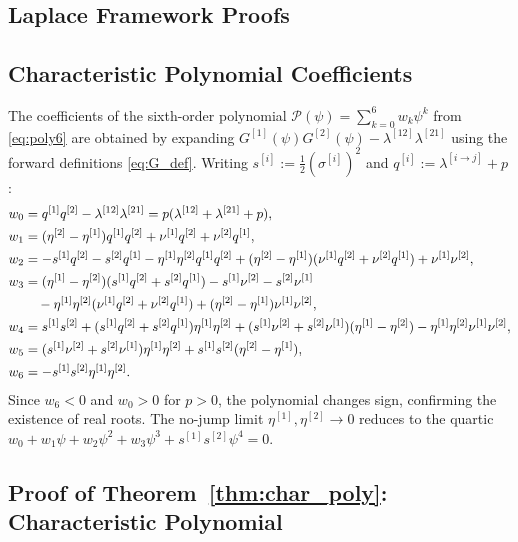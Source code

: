 \documentclass[11pt,a4paper]{article}
\numberwithin{equation}{section}
\begin{document}
\begin{appendices}
\section{Laplace Framework Proofs}\label{app:laplace_proofs}

\subsection{Characteristic Polynomial Coefficients}\label{app:poly_coeffs}

The coefficients of the sixth-order polynomial $\mathcal{P}(\psi) = \sum_{k=0}^6 w_k \psi^k$ from \eqref{eq:poly6} are obtained by expanding $G^{[1]}(\psi)G^{[2]}(\psi) - \lambda^{[12]}\lambda^{[21]}$ using the forward definitions \eqref{eq:G_def}. Writing $s^{[i]} := \tfrac{1}{2}(\sigma^{[i]})^2$ and $q^{[i]} := \lambda^{[i\to j]} + p$:
\begin{align}
w_0 &= q^{[1]}q^{[2]} - \lambda^{[12]}\lambda^{[21]} = p(\lambda^{[12]}+\lambda^{[21]}+p), \notag \\
w_1 &= (\eta^{[2]}-\eta^{[1]})q^{[1]}q^{[2]} + \nu^{[1]}q^{[2]} + \nu^{[2]}q^{[1]}, \notag \\
w_2 &= -s^{[1]}q^{[2]} - s^{[2]}q^{[1]} - \eta^{[1]}\eta^{[2]}q^{[1]}q^{[2]} + (\eta^{[2]}-\eta^{[1]})(\nu^{[1]}q^{[2]}+\nu^{[2]}q^{[1]}) + \nu^{[1]}\nu^{[2]}, \notag \\
w_3 &= (\eta^{[1]}-\eta^{[2]})(s^{[1]}q^{[2]}+s^{[2]}q^{[1]}) - s^{[1]}\nu^{[2]} - s^{[2]}\nu^{[1]} \notag \\
&\quad - \eta^{[1]}\eta^{[2]}(\nu^{[1]}q^{[2]}+\nu^{[2]}q^{[1]}) + (\eta^{[2]}-\eta^{[1]})\nu^{[1]}\nu^{[2]}, \notag \\
w_4 &= s^{[1]}s^{[2]} + (s^{[1]}q^{[2]}+s^{[2]}q^{[1]})\eta^{[1]}\eta^{[2]} + (s^{[1]}\nu^{[2]}+s^{[2]}\nu^{[1]})(\eta^{[1]}-\eta^{[2]}) - \eta^{[1]}\eta^{[2]}\nu^{[1]}\nu^{[2]}, \notag \\
w_5 &= (s^{[1]}\nu^{[2]}+s^{[2]}\nu^{[1]})\eta^{[1]}\eta^{[2]} + s^{[1]}s^{[2]}(\eta^{[2]}-\eta^{[1]}), \notag \\
w_6 &= -s^{[1]}s^{[2]}\eta^{[1]}\eta^{[2]}. \label{eq:w_coeffs}
\end{align}
Since $w_6 < 0$ and $w_0 > 0$ for $p > 0$, the polynomial changes sign, confirming the existence of real roots. The no-jump limit $\eta^{[1]}, \eta^{[2]} \to 0$ reduces to the quartic $w_0 + w_1\psi + w_2\psi^2 + w_3\psi^3 + s^{[1]}s^{[2]}\psi^4 = 0$.


\subsection{Proof of Theorem~\ref{thm:char_poly}: Characteristic Polynomial}\label{app:char_poly}


\end{appendices}
\end{document}
